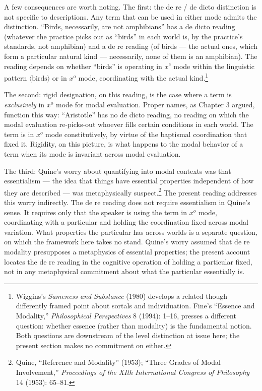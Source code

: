 \documentclass[12pt,a4paper]{article}
\begin{document}
A few consequences are worth noting. The first: the de re / de dicto distinction is not specific to descriptions. Any term that can be used in either mode admits the distinction. ``Birds, necessarily, are not amphibians'' has a de dicto reading (whatever the practice picks out as ``birds'' in each world is, by the practice's standards, not amphibian) and a de re reading (of birds --- the actual ones, which form a particular natural kind --- necessarily, none of them is an amphibian). The reading depends on whether ``birds'' is operating in \(x^c\) mode within the linguistic pattern \(\langle \text{birds} \rangle\) or in \(x^o\) mode, coordinating with the actual kind.\footnote{Wiggins's \emph{Sameness and Substance} (1980) develops a related though differently framed point about sortals and individuation. Fine's ``Essence and Modality,'' \emph{Philosophical Perspectives} 8 (1994): 1--16, presses a different question: whether essence (rather than modality) is the fundamental notion. Both questions are downstream of the level distinction at issue here; the present section makes no commitment on either.}

The second: rigid designation, on this reading, is the case where a term is \emph{exclusively} in \(x^o\) mode for modal evaluation. Proper names, as Chapter 3 argued, function this way: ``Aristotle'' has no de dicto reading, no reading on which the modal evaluation re-picks-out whoever fills certain conditions in each world. The term is in \(x^o\) mode constitutively, by virtue of the baptismal coordination that fixed it. Rigidity, on this picture, is what happens to the modal behavior of a term when its mode is invariant across modal evaluation.

The third: Quine's worry about quantifying into modal contexts was that essentialism --- the idea that things have essential properties independent of how they are described --- was metaphysically suspect.\footnote{Quine, ``Reference and Modality'' (1953); ``Three Grades of Modal Involvement,'' \emph{Proceedings of the XIth International Congress of Philosophy} 14 (1953): 65--81.} The present reading addresses this worry indirectly. The de re reading does not require essentialism in Quine's sense. It requires only that the speaker is using the term in \(x^o\) mode, coordinating with a particular and holding the coordination fixed across modal variation. What properties the particular has across worlds is a separate question, on which the framework here takes no stand. Quine's worry assumed that de re modality presupposes a metaphysics of essential properties; the present account locates the de re reading in the cognitive operation of holding a particular fixed, not in any metaphysical commitment about what the particular essentially is.
\end{document}
